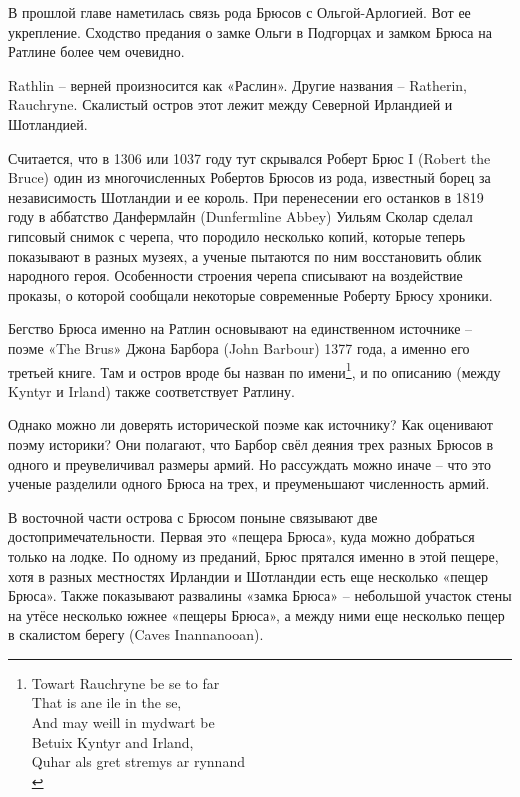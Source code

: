 В прошлой главе наметилась связь рода Брюсов с Ольгой-Арлогией. Вот ее укрепление. Сходство предания о замке Ольги в Подгорцах и замком Брюса на Ратлине более чем очевидно.

Rathlin – верней произносится как «Раслин». Другие названия – Ratherin, Rauchryne. Скалистый остров этот лежит между Северной Ирландией и Шотландией. 

Считается, что в 1306 или 1037 году тут скрывался Роберт Брюс I (Robert the Bruce) один из многочисленных Робертов Брюсов из рода, известный борец за независимость Шотландии и ее король. При перенесении его останков в 1819 году в аббатство Данфермлайн (Dunfermline Abbey) Уильям Сколар сделал гипсовый снимок с черепа, что породило несколько копий, которые теперь показывают в разных музеях, а ученые пытаются по ним восстановить облик народного героя. Особенности строения черепа списывают на воздействие проказы, о которой сообщали некоторые современные Роберту Брюсу хроники.

Бегство Брюса именно на Ратлин основывают на единственном источнике – поэме «The Brus» Джона Барбора (John Barbour) 1377 года, а именно его третьей книге. Там и остров вроде бы назван по имени\footnote{Towart Rauchryne be se to far\\
That is ane ile in the se,\\
And may weill in mydwart be\\
Betuix Kyntyr and Irland,\\
Quhar als gret stremys ar rynnand\\}, и по описанию (между Kyntyr и Irland) также соответствует Ратлину.

Однако можно ли доверять исторической поэме как источнику? Как оценивают поэму историки? Они полагают, что Барбор свёл деяния трех разных Брюсов в одного и преувеличивал размеры армий. Но рассуждать можно иначе – что это ученые разделили одного Брюса на трех, и преуменьшают численность армий. 

В восточной части острова с Брюсом поныне связывают две достопримечательности. Первая это «пещера Брюса», куда можно добраться только на лодке. По одному из преданий, Брюс прятался именно в этой пещере, хотя в разных местностях Ирландии и Шотландии есть еще несколько  «пещер Брюса». Также показывают развалины «замка Брюса» – небольшой участок стены на утёсе несколько южнее «пещеры Брюса», а между ними еще несколько пещер в скалистом берегу (Caves Inannanooan). 

